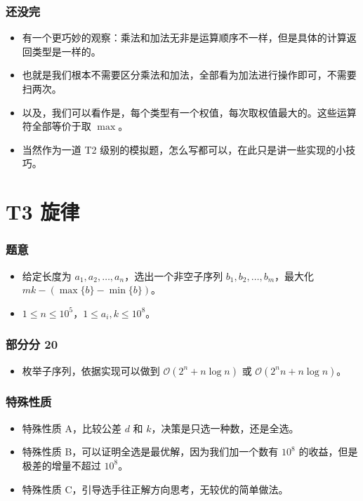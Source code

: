 \documentclass[aspectratio=169]{ctexbeamer}
\begin{document}
\begin{frame}
  \frametitle{还没完}

  \begin{itemize}
    \item <1 - > 有一个更巧妙的观察：乘法和加法无非是运算顺序不一样，但是具体的计算返回类型是一样的。
    \item <2 - > 也就是我们根本不需要区分乘法和加法，全部看为加法进行操作即可，不需要扫两次。
    \item <3 - > 以及，我们可以看作是，每个类型有一个权值，每次取权值最大的。这些运算符全部等价于取 $\max$。
    \item <4 - > 当然作为一道 T2 级别的模拟题，怎么写都可以，在此只是讲一些实现的小技巧。
  \end{itemize}

\end{frame}

\section{T3 旋律}


\begin{frame}
  \frametitle{题意}

  \begin{itemize}
    \item <1 - > 给定长度为 $a_1,a_2,\dots,a_n$，选出一个非空子序列 $b_1,b_2,\dots,b_m$，最大化 $mk-(\max\{b\}-\min\{b\})$。
    \item <2 - > $1\leq n\leq 10^5$，$1\leq a_i,k\leq 10^8$。
  \end{itemize}

\end{frame}

\begin{frame}
  \frametitle{部分分 20}

  \begin{itemize}
    \item <1 - > 枚举子序列，依据实现可以做到 $\mathcal O(2^n+n\log n)$ 或 $\mathcal O(2^nn+n\log n)$。
  \end{itemize}

\end{frame}

\begin{frame}
  \frametitle{特殊性质}

  \begin{itemize}
    \item <1 - > 特殊性质 A，比较公差 $d$ 和 $k$，决策是只选一种数，还是全选。
    \item <2 - > 特殊性质 B，可以证明全选是最优解，因为我们加一个数有 $10^8$ 的收益，但是极差的增量不超过 $10^8$。
    \item <3 - > 特殊性质 C，引导选手往正解方向思考，无较优的简单做法。
  \end{itemize}

\end{frame}
\end{document}
